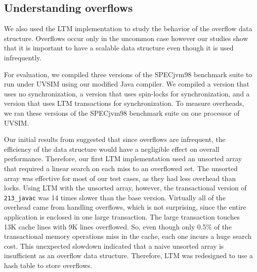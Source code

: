 \subsection{Understanding overflows}

We also used the LTM implementation to study the behavior of the
overflow data structure. Overflows occur only in the uncommon case
however our studies show that it is important to have a scalable data
structure even though it is used infrequently.

For evaluation, we compiled three versions of the SPECjvm98 benchmark
suite to run under UVSIM using our modified Java compiler. We compiled
a  version that uses no synchronization, a 
version that uses spin-locks for synchronization, and a 
version that uses LTM transactions for synchronization. To measure
overheads, we ran these versions of the SPECjvm98 benchmark suite on
one processor of UVSIM.


\label{sec:javac}
Our initial results from  suggested that since
overflows are infrequent, the efficiency of the data structure would
have a negligible effect on overall performance. Therefore, our first
LTM implementation used an unsorted array that required a linear
search on each miss to an overflowed set. The unsorted array was
effective for most of our test cases, as they had less overhead than
locks.  Using LTM with the unsorted array, however, the transactional
version of \texttt{213\_javac} was 14 times slower than the base
version.  Virtually all of the overhead came from handling overflows,
which is not surprising, since the entire application is enclosed in
one large transaction. The large transaction touches 13K cache lines
with 9K lines overflowed.  So, even though only 0.5\% of the
transactional memory operations miss in the cache, each one incurs a
huge search cost. This unexpected slowdown indicated that a naive
unsorted array is insufficient as an overflow data
structure. Therefore, LTM was redesigned to use a hash table to store
overflows.

